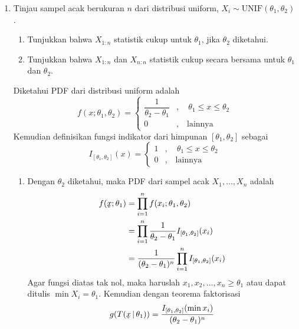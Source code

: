 \documentclass{exam}
\begin{document}
\begin{enumerate}
    \item Tinjau sampel acak berukuran \(n\) dari distribusi uniform, \(X_i \sim \text{UNIF}(\theta_1, \theta_2)\).
    \begin{enumerate}
        \item Tunjukkan bahwa \(X_{1:n}\) statistik cukup untuk \(\theta_1\), jika \(\theta_2\) diketahui.
        \item Tunjukkan bahwa \(X_{1:n}\) dan \(X_{n:n}\) statistik cukup secara bersama untuk \(\theta_1\) dan \(\theta_2\).
    \end{enumerate}
    \begin{solution}
        Diketahui PDF dari distribusi uniform adalah
        \begin{equation*}
            f(x;\theta_1,\theta_2) = \begin{cases}
                \dfrac{1}{\theta_2-\theta_1}&,\quad\theta_1\leq x\leq\theta_2\\
                0&,\quad\text{lainnya}
            \end{cases}
        \end{equation*}
        Kemudian definisikan fungsi indikator dari himpunan \([\theta_1,\theta_2]\) sebagai
        \begin{equation*}
            I_{[\theta_1,\theta_2]}(x) = \begin{cases}
                1&,\quad\theta_1\leq x\leq\theta_2\\
                0&,\quad\text{lainnya}
            \end{cases}
        \end{equation*}
        \begin{enumerate}
            \item Dengan \(\theta_2\) diketahui, maka PDF dari sampel acak \(X_1,\dots,X_n\) adalah
            \begin{align*}
                f(\underaccent{\tilde}{x};\theta_1) &= \prod_{i=1}^n f(x_i;\theta_1,\theta_2)\\
                &= \prod_{i=1}^n \frac{1}{\theta_2-\theta_1}I_{[\theta_1,\theta_2]}(x_i)\\
                &= \frac{1}{(\theta_2-\theta_1)^n}\prod_{i=1}^n I_{[\theta_1,\theta_2]}(x_i)
            \end{align*}
            Agar fungsi diatas tak nol, maka haruslah \(x_1,x_2,\dots,x_n\geq\theta_1\) atau dapat ditulis \(\min X_i=\theta_1\). Kemudian dengan teorema faktorisasi
            \begin{align*}
                g(T(\underaccent{\tilde}{x}\,|\,\theta_1)) &= \frac{I_{[\theta_1,\theta_2]}(\min x_i)}{(\theta_2-\theta_1)^n}\\

\end{align*}
\end{enumerate}
\end{solution}
\end{enumerate}
\end{document}
